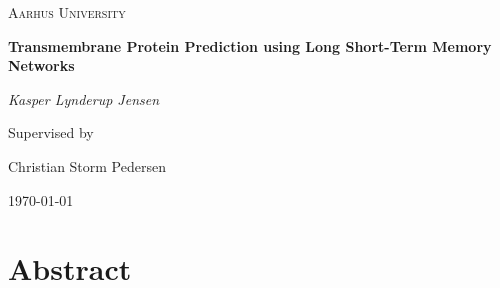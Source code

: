 \documentclass{article}
\begin{document}

\begin{titlepage}
	\centering
	{\scshape\LARGE Aarhus University \par}
	\vspace{1cm}
	{\huge\bfseries Transmembrane Protein Prediction using Long Short-Term Memory Networks\par}
	\vspace{2cm}
	{\Large\itshape Kasper Lynderup Jensen \par}
	\vfill
	Supervised by\par
	Christian Storm Pedersen
	
	\vfill
	
	{\large \today\par}
\end{titlepage}

\section*{Abstract}

\tableofcontents

















\printbibliography
\end{document}
